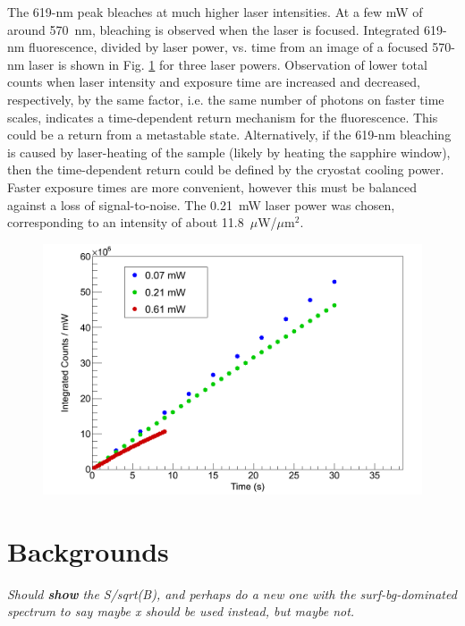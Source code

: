 The 619-nm peak bleaches at much higher laser intensities.  At a few mW of around 570~nm, bleaching is observed when the laser is focused.  Integrated 619-nm fluorescence, divided by laser power, vs. time from an image of a focused 570-nm laser is shown in Fig. \ref{fig:bleaching619} for three laser powers.  Observation of lower total counts when laser intensity and exposure time are increased and decreased, respectively, by the same factor, i.e. the same number of photons on faster time scales, indicates a time-dependent return mechanism for the fluorescence.  This could be a return from a metastable state.  Alternatively, if the 619-nm bleaching is caused by laser-heating of the sample (likely by heating the sapphire window), then the time-dependent return could be defined by the cryostat cooling power.  Faster exposure times are more convenient, however this must be balanced against a loss of signal-to-noise.  The 0.21~mW laser power was chosen, corresponding to an intensity of about 11.8~$\mu$W/$\mu$m$^{2}$.

\begin{figure} %
        \centering
                \includegraphics[width=.7\textwidth]{figures/619_bleach_summed_per_mW.png}
                \caption{}
\label{fig:bleaching619}
\end{figure}


\section{Backgrounds}
\label{sec:bgs}

\emph{\color{gray}Should \textbf{show} the S/sqrt(B), and perhaps do a new one with the surf-bg-dominated spectrum to say maybe x should be used instead, but maybe not.}


